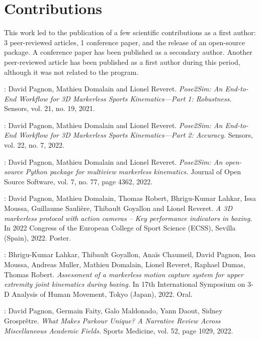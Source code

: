 \FloatBarrier
\section*{Contributions}

This work led to the publication of a few scientific contributions as a first author: 3 peer-reviewed articles, 1 conference paper, and the release of an open-source package. A conference paper has been published as a secondary author.
Another peer-reviewed article has been published as a first author during this period, although it was not related to the program.

\noindent\cite{Pagnon2021}: David Pagnon, Mathieu Domalain and Lionel Reveret. \textit{Pose2Sim: An
End-to-End Workflow for 3D Markerless Sports Kinematics—Part 1:
Robustness.} Sensors, vol. 21, no. 19, 2021.

\noindent\cite{Pagnon2022a}: David Pagnon, Mathieu Domalain and Lionel Reveret. \textit{Pose2Sim: An
End-to-End Workflow for 3D Markerless Sports Kinematics—Part 2:
Accuracy.} Sensors, vol. 22, no. 7, 2022.

\noindent\cite{Pagnon2022b}: David Pagnon, Mathieu Domalain and Lionel Reveret. \textit{Pose2Sim:
An open-source Python package for multiview markerless kinematics.}
Journal of Open Source Software, vol. 7, no. 77, page 4362, 2022.

\noindent\cite{Pagnon2022c}: 
David Pagnon, Mathieu Domalain, Thomas Robert, Bhrigu-Kumar Lahkar, Issa Moussa, Guillaume Saulière, Thibault Goyallon and Lionel Reveret. \textit{A 3D markerless protocol with action cameras – Key performance indicators in boxing.} In 2022 Congress of the European College of Sport Science (ECSS), Sevilla (Spain), 2022. Poster.

\noindent\cite{Lahkar2022a}: 
Bhrigu-Kumar Lahkar, Thibault Goyallon, Anaïs Chaumeil, David Pagnon, Issa Moussa, Andreas Muller, Mathieu Domalain, Lionel Reveret, Raphael Dumas, Thomas Robert. \textit{Assessment of a markerless motion capture system for upper extremity joint kinematics during boxing.} In 17th International Symposium on 3-D Analysis of Human Movement, Tokyo (Japan), 2022. Oral.


\noindent\cite{Pagnon2022d}: 
David Pagnon, Germain Faity, Galo Maldonado, Yann Daout, Sidney Grosprêtre. \textit{What Makes Parkour Unique? A Narrative Review Across Miscellaneous Academic Fields.} Sports Medicine, vol. 52, page 1029, 2022.
